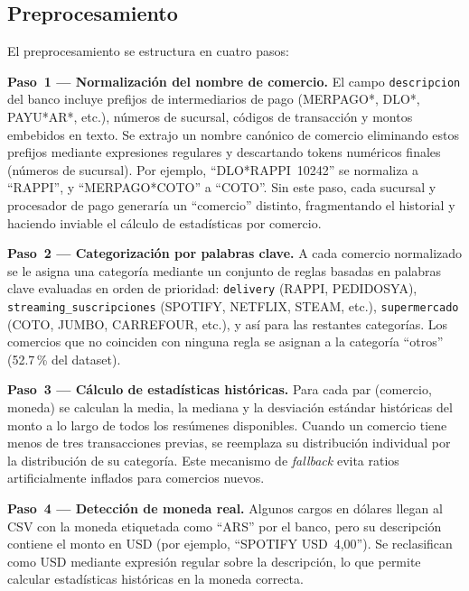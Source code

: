 \documentclass[conference]{IEEEtran}
\begin{document}
\subsection{Preprocesamiento}

El preprocesamiento se estructura en cuatro pasos:

\textbf{Paso~1 --- Normalizaci\'on del nombre de comercio.}
El campo \texttt{descripcion} del banco incluye prefijos de intermediarios de pago
(MERPAGO*, DLO*, PAYU*AR*, etc.), n\'umeros de sucursal, c\'odigos de transacci\'on
y montos embebidos en texto. Se extrajo un nombre can\'onico de comercio eliminando
estos prefijos mediante expresiones regulares y descartando tokens num\'ericos finales
(n\'umeros de sucursal). Por ejemplo, ``DLO*RAPPI~10242'' se normaliza a ``RAPPI'',
y ``MERPAGO*COTO'' a ``COTO''. Sin este paso, cada sucursal y procesador de pago
generar\'ia un ``comercio'' distinto, fragmentando el historial y haciendo inviable
el c\'alculo de estad\'isticas por comercio.

\textbf{Paso~2 --- Categorizaci\'on por palabras clave.}
A cada comercio normalizado se le asigna una categor\'ia mediante un conjunto de
reglas basadas en palabras clave evaluadas en orden de prioridad:
\texttt{delivery} (RAPPI, PEDIDOSYA), \texttt{streaming\_suscripciones} (SPOTIFY,
NETFLIX, STEAM, etc.), \texttt{supermercado} (COTO, JUMBO, CARREFOUR, etc.),
y as\'i para las restantes categor\'ias. Los comercios que no coinciden con ninguna
regla se asignan a la categor\'ia ``otros'' (52.7\,\% del dataset).

\textbf{Paso~3 --- C\'alculo de estad\'isticas hist\'oricas.}
Para cada par (comercio, moneda) se calculan la media, la mediana y la desviaci\'on
est\'andar hist\'oricas del monto a lo largo de todos los res\'umenes disponibles.
Cuando un comercio tiene menos de tres transacciones previas, se reemplaza su
distribuci\'on individual por la distribuci\'on de su categor\'ia. Este mecanismo de
\emph{fallback} evita ratios artificialmente inflados para comercios nuevos.

\textbf{Paso~4 --- Detecci\'on de moneda real.}
Algunos cargos en d\'olares llegan al CSV con la moneda etiquetada como ``ARS'' por
el banco, pero su descripci\'on contiene el monto en USD (por ejemplo,
``SPOTIFY USD~4,00''). Se reclasifican como USD mediante expresi\'on regular sobre
la descripci\'on, lo que permite calcular estad\'isticas hist\'oricas en la moneda
correcta.
\end{document}
